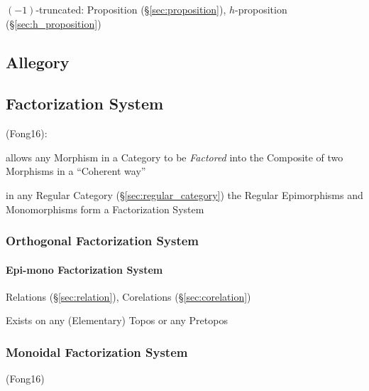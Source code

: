 $(-1)$-truncated: Proposition (\S\ref{sec:proposition}),
$h$-proposition (\S\ref{sec:h_proposition})



\subsection{Allegory}\label{sec:allegory}

\subsection{Factorization System}\label{sec:factorization_system}

(Fong16):

allows any Morphism in a Category to be \emph{Factored} into the
Composite of two Morphisms in a ``Coherent way'' %

in any Regular Category (\S\ref{sec:regular_category}) the Regular
Epimorphisms and Monomorphisms form a Factorization System



\subsubsection{Orthogonal Factorization System}
\label{sec:orthogonal_factorization_system}

\paragraph{Epi-mono Factorization System}
\label{sec:epimono_factorization}\hfill

Relations (\S\ref{sec:relation}), Corelations (\S\ref{sec:corelation})

Exists on any (Elementary) Topos or any Pretopos %



\subsubsection{Monoidal Factorization System}
\label{sec:monoidal_factorization_system}

(Fong16)



